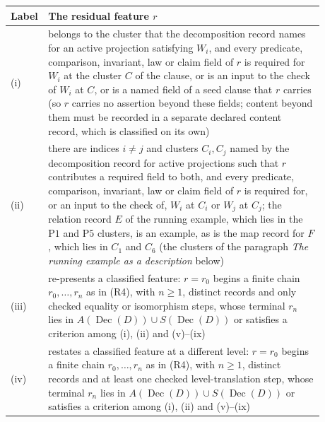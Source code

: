 \documentclass[11pt]{article}
\theoremstyle{definition}
\newcommand{\Dec}[1]{\ensuremath{\operatorname{Dec}\!\left(#1\right)}}
\newcommand{\Pone}{\ensuremath{\mathrm{P1}}}
\newcommand{\Pfive}{\ensuremath{\mathrm{P5}}}
\begin{document}
\begin{longtable}{@{}l>{\raggedright\arraybackslash}p{0.88\linewidth}@{}}
\toprule
Label & The residual feature \(r\) \\
\midrule
\endhead
(i) & belongs to the cluster that the decomposition record names for an active projection satisfying \(W_i\), and every predicate, comparison, invariant, law or claim field of \(r\) is required for \(W_i\) at the cluster \(C\) of the clause, or is an input to the check of \(W_i\) at \(C\), or is a named field of a seed clause that \(r\) carries (so \(r\) carries no assertion beyond these fields; content beyond them must be recorded in a separate declared content record, which is classified on its own) \\
(ii) & there are indices \(i\neq j\) and clusters \(C_i,C_j\) named by the decomposition record for active projections such that \(r\) contributes a required field to both, and every predicate, comparison, invariant, law or claim field of \(r\) is required for, or an input to the check of, \(W_i\) at \(C_i\) or \(W_j\) at \(C_j\); the relation record \(E\) of the running example, which lies in the \Pone{} and \Pfive{} clusters, is an example, as is the map record for \(F\), which lies in \(C_1\) and \(C_6\) (the clusters of the paragraph \emph{The running example as a description} below) \\
(iii) & re-presents a classified feature: \(r=r_0\) begins a finite chain \(r_0,\ldots,r_n\) as in (R4), with \(n\geq1\), distinct records and only checked equality or isomorphism steps, whose terminal \(r_n\) lies in \(A(\Dec{D})\cup S(\Dec{D})\) or satisfies a criterion among (i), (ii) and (v)--(ix) \\
(iv) & restates a classified feature at a different level: \(r=r_0\) begins a finite chain \(r_0,\ldots,r_n\) as in (R4), with \(n\geq1\), distinct records and at least one checked level-translation step, whose terminal \(r_n\) lies in \(A(\Dec{D})\cup S(\Dec{D})\) or satisfies a criterion among (i), (ii) and (v)--(ix) \\

\end{longtable}
\end{document}
